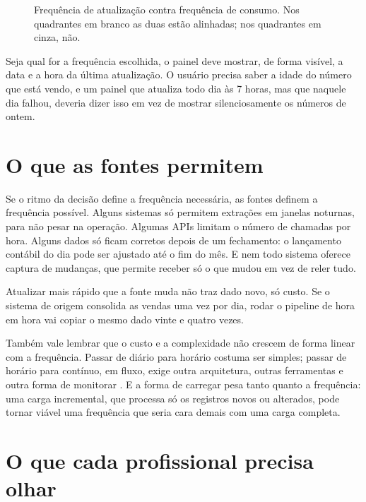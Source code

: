 \begin{figure}[htbp]
  \centering
  
  \caption{Frequência de atualização contra frequência de consumo. Nos quadrantes em
    branco as duas estão alinhadas; nos quadrantes em cinza, não.}
  \label{fig:frequencia-consumo}
\end{figure}

Seja qual for a frequência escolhida, o painel deve mostrar, de forma visível, a data e a hora
da última atualização. O usuário precisa saber a idade do número que está vendo, e um painel
que atualiza todo dia às 7 horas, mas que naquele dia falhou, deveria dizer isso em vez de
mostrar silenciosamente os números de ontem.


\section{O que as fontes permitem}
\label{sec:limites-fontes}

Se o ritmo da decisão define a frequência necessária, as fontes definem a frequência possível.
Alguns sistemas só permitem extrações em janelas noturnas, para não pesar na operação. Algumas
APIs limitam o número de chamadas por hora. Alguns dados só ficam corretos depois de um
fechamento: o lançamento contábil do dia pode ser ajustado até o fim do mês. E nem todo sistema
oferece captura de mudanças, que permite receber só o que mudou em vez de reler tudo.

Atualizar mais rápido que a fonte muda não traz dado novo, só custo. Se o sistema de origem
consolida as vendas uma vez por dia, rodar o pipeline de hora em hora vai copiar o mesmo dado
vinte e quatro vezes.

Também vale lembrar que o custo e a complexidade não crescem de forma linear com a frequência.
Passar de diário para horário costuma ser simples; passar de horário para contínuo, em
fluxo, exige outra arquitetura, outras ferramentas e outra forma de monitorar
\parencite{reis2022}. E a forma de carregar pesa tanto quanto a frequência: uma carga
incremental, que processa só os registros novos ou alterados, pode tornar viável uma
frequência que seria cara demais com uma carga completa.

\section{O que cada profissional precisa olhar}
\label{sec:papeis-frequencia}


